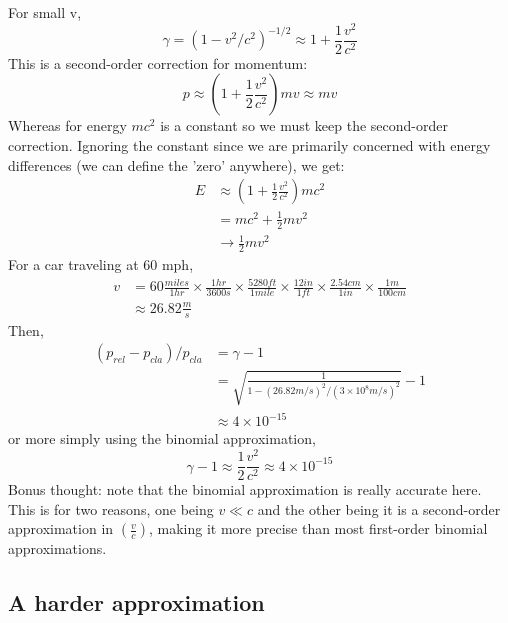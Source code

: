 \documentclass{article}
\begin{document}
For small v,
\begin{equation}
\gamma = (1-v^2/c^2)^{-1/2} \approx 1 + \frac{1}{2}\frac{v^2}{c^2}
\end{equation}
This is a second-order correction for momentum:
\begin{equation}
p \approx \left(1 + \frac{1}{2}\frac{v^2}{c^2}\right) mv \approx mv
\end{equation}
Whereas for energy $mc^2$ is a constant so we must keep the second-order correction. Ignoring the constant since we are primarily concerned with energy differences (we can define the 'zero' anywhere), we get:
\begin{align*}
E &\approx \left(1 + \frac{1}{2}\frac{v^2}{c^2}\right) mc^2 \\
&= mc^2 + \frac{1}{2} mv^2 \\
&\rightarrow \frac{1}{2} mv^2
\end{align*}
For a car traveling at 60 mph,
\begin{align*}
v &= 60 \frac{miles}{1 hr} \times \frac{1 hr}{3600 s} \times \frac{5280 ft}{1 mile} \times \frac{12 in}{1 ft} \times \frac{2.54 cm}{1 in} \times \frac{1 m}{100 cm} \\
&\approx 26.82 \frac{m}{s}
\end{align*}
Then,
\begin{align*}
(p_{rel}-p_{cla})/p_{cla} &= \gamma - 1 \\
&= \sqrt{\frac{1}{1-(26.82 m/s)^2/(3\times10^8 m/s)^2}} - 1 \\
&\approx 4 \times 10^{-15}
\end{align*}
or more simply using the binomial approximation,
\begin{equation}
\gamma - 1 \approx \frac{1}{2}\frac{v^2}{c^2} \approx 4 \times 10^{-15}
\end{equation}
Bonus thought: note that the binomial approximation is really accurate here. This is for two reasons, one being $v\ll c$ and the other being it is a second-order approximation in $\left(\frac{v}{c}\right)$, making it more precise than most first-order binomial approximations.

\subsection{A harder approximation}
\end{document}

